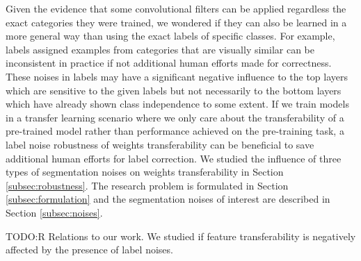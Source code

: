 Given the evidence that some convolutional filters can be applied regardless the exact categories they were trained, we wondered if they can also be learned in a more general way than using the exact labels of specific classes.
For example, labels assigned examples from categories that are visually similar can be inconsistent in practice if not additional human efforts made for correctness.
These noises in labels may have a significant negative influence to the top layers which are sensitive to the given labels but not necessarily to the bottom layers which have already shown class independence to some extent.
If we train models in a transfer learning scenario where we only care about the transferability of a pre-trained model rather than performance achieved on the pre-training task, a label noise robustness of weights transferability can be beneficial to save additional human efforts for label correction.
We studied the influence of three types of segmentation noises on weights transferability in Section \ref{subsec:robustness}.
The research problem is formulated in Section \ref{subsec:formulation} and the segmentation noises of interest are described in Section \ref{subsec:noises}.

{TODO:R} Relations to our work.
We studied if feature transferability is negatively affected by the presence of label noises.

